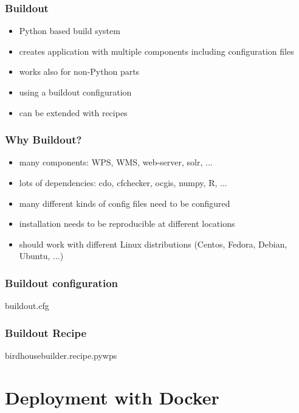 \documentclass{beamer}
\begin{document}
  \begin{frame}
    \frametitle{Buildout}
    \begin{itemize}
      \item Python based build system
      \item creates application with multiple components including configuration files
      \item works also for non-Python parts
      \item using a buildout configuration 
      \item can be extended with recipes
    \end{itemize}
  \end{frame}

  \begin{frame}
    \frametitle{Why Buildout?}
    \begin{itemize}
      \item many components: WPS, WMS, web-server, solr, ...
      \item lots of dependencies: cdo, cfchecker, ocgis, numpy, R, ...
      \item many different kinds of config files need to be configured 
      \item installation needs to be reproducible at different locations
      \item should work with different Linux distributions (Centos, Fedora, Debian, Ubuntu, ...)
    \end{itemize}
  \end{frame}

  \begin{frame}[shrink]
    \frametitle{Buildout configuration}
    \begin{block}{buildout.cfg}
      
    \end{block}
\end{frame}

  \begin{frame}[shrink]
    \frametitle{Buildout Recipe}
    \begin{block}{birdhousebuilder.recipe.pywps}
      
    \end{block}
\end{frame}


  \section{Deployment with Docker}
\end{document}
